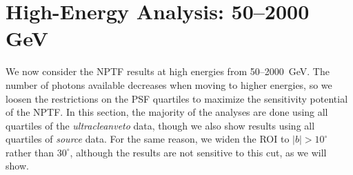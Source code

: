  

\section{High-Energy Analysis: 50--2000 GeV}
\label{sec:highenergy}

We now consider the NPTF results at high energies from 50--2000~GeV.  The number of photons available decreases when moving to higher energies, so we loosen the restrictions on the PSF quartiles to maximize the sensitivity potential of the NPTF.  In this section, the majority of the analyses are done using all quartiles of the {\it ultracleanveto} data, though we also show results using all quartiles of {\it source} data.  For the same reason, we widen the ROI to $|b| > 10^\circ$ rather than $30^\circ$, although the results are not sensitive to this cut, as we will show.

